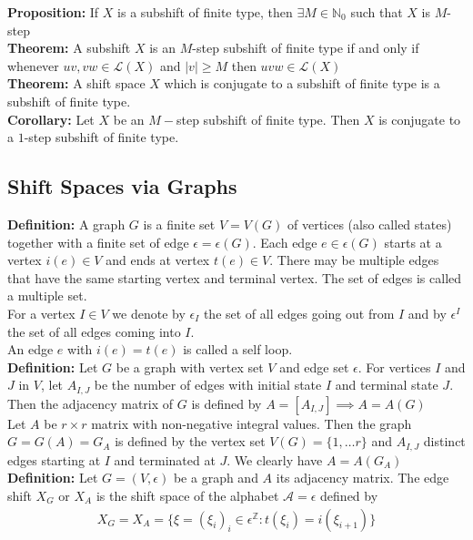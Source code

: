\documentclass[12pt]{article}
\begin{document}
\textbf{Proposition:} If $X$ is a subshift of finite type, then $\exists M \in \mathbb{N}_0$ such that $X$ is $M$-step\\

\textbf{Theorem:} A subshift $X$ is an $M$-step subshift of finite type if and only if whenever $uv, vw \in \mathcal{L}(X)$ and $|v| \geq M$ then $uvw \in \mathcal{L}(X)$\\

\textbf{Theorem:} A shift space $X$ which is conjugate to a subshift of finite type is a subshift of finite type.\\

\textbf{Corollary:} Let $X$ be an $M-$step subshift of finite type. Then $X$ is conjugate to a $1$-step subshift of finite type.

\subsection{Shift Spaces via Graphs}

\textbf{Definition:} A graph $G$ is a finite set $V = V(G)$ of vertices (also called states) together with a finite set of edge $\epsilon = \epsilon(G)$. Each edge $e \in \epsilon(G)$ starts at a vertex $i(e) \in V$ and ends at vertex $t(e) \in V$. There may be multiple edges that have the same starting vertex and terminal vertex. The set of edges is called a multiple set.\\

For a vertex $I \in V$ we denote by $\epsilon_I$ the set of all edges going out from $I$ and by $\epsilon^I$ the set of all edges coming into $I$.\\

An edge $e$ with $i(e) = t(e)$ is called a self loop.\\

\textbf{Definition:} Let $G$ be a graph with vertex set $V$ and edge set $\epsilon$. For vertices $I$ and $J$ in $V$, let $A_{I,J}$ be the number of edges with initial state $I$ and terminal state $J$. Then the adjacency matrix of $G$ is defined by $A = [A_{I,J}] \implies A = A(G)$\\

Let $A$ be $r \times r$ matrix with non-negative integral values. Then the graph $G = G(A) = G_A$ is defined by the vertex set $V(G) = \{1, \ldots r\}$ and $A_{I,J}$ distinct edges starting at $I$ and terminated at $J$. We clearly have $A = A(G_A)$\\

\textbf{Definition:} Let $G = (V, \epsilon)$ be a graph and $A$ its adjacency matrix. The edge shift $X_G$ or $X_A$ is the shift space of the alphabet $\mathcal{A} = \epsilon$ defined by 
\begin{align*}
X_G = X_A = \{\xi = (\xi_i)_i \in \epsilon^{\mathbb{Z}}: t(\xi_i) = i(\xi_{i+1})\}
\end{align*}
\end{document}
